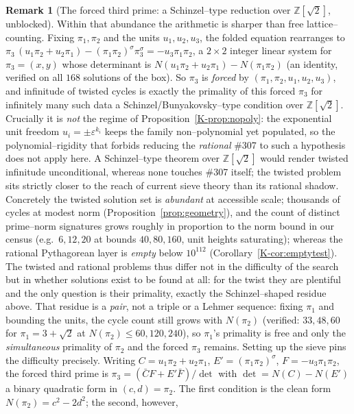 \documentclass[11pt]{article}
\theoremstyle{definition}
\newtheorem{remark}[theorem]{Remark}
\begin{document}
\begin{remark}[{The forced third prime: a Schinzel--type reduction over $\mathbb{Z}[\sqrt2]$, unblocked}]
\label{rem:forced}
Within that abundance the arithmetic is sharper than free lattice--counting. Fixing $\pi_1,\pi_2$ and the
units $u_1,u_2,u_3$, the folded equation rearranges to
$\pi_3\,(u_1\pi_2+u_2\pi_1)-(\pi_1\pi_2)^\sigma\pi_3^\sigma=-u_3\pi_1\pi_2$, a $2\times2$ integer linear
system for $\pi_3=(x,y)$ whose determinant is $N(u_1\pi_2+u_2\pi_1)-N(\pi_1\pi_2)$ (an identity, verified
on all $168$ solutions of the box). So $\pi_3$ is \emph{forced} by $(\pi_1,\pi_2,u_1,u_2,u_3)$, and
infinitude of twisted cycles is exactly the primality of this forced $\pi_3$ for infinitely many such data
a Schinzel/Bunyakovsky--type condition over $\mathbb{Z}[\sqrt2]$. Crucially it is \emph{not} the regime
of Proposition~\ref{K-prop:nopoly}: the exponential unit freedom $u_i=\pm\varepsilon^{k_i}$ keeps the family
non--polynomial yet populated, so the polynomial--rigidity that forbids reducing the \emph{rational} \#307
to such a hypothesis does not apply here. A Schinzel--type theorem over $\mathbb{Z}[\sqrt2]$ would render
twisted infinitude unconditional, whereas none touches \#307 itself; the twisted problem sits strictly
closer to the reach of current sieve theory than its rational shadow. Concretely the twisted solution set
is \emph{abundant} at accessible scale; thousands of cycles at modest norm (Proposition~\ref{prop:geometry}),
and the count of distinct prime--norm signatures grows roughly in proportion to the norm bound in our census
(e.g.\ $6,12,20$ at bounds $40,80,160$, unit heights saturating); whereas the rational Pythagorean layer
is \emph{empty} below $10^{112}$ (Corollary~\ref{K-cor:emptytest}). The twisted and rational problems thus differ
not in the difficulty of the search but in whether solutions exist to be found at all: for the twist they are
plentiful and the only question is their primality, exactly the Schinzel--shaped residue above. That residue is a
\emph{pair}, not a triple or a Lehmer sequence: fixing $\pi_1$ and bounding the units, the cycle count still
grows with $N(\pi_2)$ (verified: $33,48,60$ for $\pi_1=3+\sqrt2$ at $N(\pi_2)\le60,120,240$), so $\pi_1$'s
primality is free and only the \emph{simultaneous} primality of $\pi_2$ and the forced $\pi_3$ remains. Setting up
the sieve pins the difficulty precisely. Writing $C=u_1\pi_2+u_2\pi_1$, $E'=(\pi_1\pi_2)^\sigma$,
$F=-u_3\pi_1\pi_2$, the forced third prime is $\pi_3=(\bar CF+E'\bar F)/\det$ with $\det=N(C)-N(E')$ a binary
quadratic form in $(c,d)=\pi_2$. The first condition is the clean form $N(\pi_2)=c^2-2d^2$; the second, however,

\end{remark}
\end{document}
